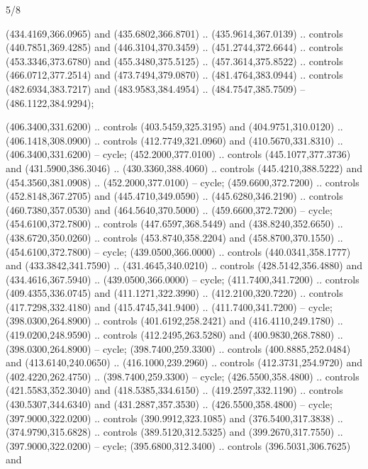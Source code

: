 \begin{flagdescription}{5/8}
\begin{scope}[shift={(0.5\flaglength,0.5\flagwidth)},scale=\flagwidth*\stretchfactor/820]
\begin{scope}[scale=1.84,xshift=-135mm,yshift=84mm]
\begin{scope}[y=0.80pt, x=0.80pt, yscale=-1, xscale=1]
\begin{scope}[cm={{1.01416,0.0,0.0,1.033,(-6.79641,-9.89449)}}]
\begin{scope}[draw=c24420e]
\begin{scope}[line width=0.131\lw]
  (434.4169,366.0965) and (435.6802,366.8701) .. (435.9614,367.0139) .. controls
  (440.7851,369.4285) and (446.3104,370.3459) .. (451.2744,372.6644) .. controls
  (453.3346,373.6780) and (455.3480,375.5125) .. (457.3614,375.8522) .. controls
  (466.0712,377.2514) and (473.7494,379.0870) .. (481.4764,383.0944) .. controls
  (482.6934,383.7217) and (483.9583,384.4954) .. (484.7547,385.7509) --
  (486.1122,384.9294);
\begin{scope}[fill=c67923d]
 (406.3400,331.6200) .. controls (403.5459,325.3195) and
  (404.9751,310.0120) .. (406.1418,308.0900) .. controls (412.7749,321.0960) and
  (410.5670,331.8310) .. (406.3400,331.6200) -- cycle;
 (452.2000,377.0100) .. controls (445.1077,377.3736) and
  (431.5900,386.3046) .. (430.3360,388.4060) .. controls (445.4210,388.5222) and
  (454.3560,381.0908) .. (452.2000,377.0100) -- cycle;
 (459.6600,372.7200) .. controls (452.8148,367.2705) and
  (445.4710,349.0590) .. (445.6280,346.2190) .. controls (460.7380,357.0530) and
  (464.5640,370.5000) .. (459.6600,372.7200) -- cycle;
 (454.6100,372.7800) .. controls (447.6597,368.5449) and
  (438.8240,352.6650) .. (438.6720,350.0260) .. controls (453.8740,358.2204) and
  (458.8700,370.1550) .. (454.6100,372.7800) -- cycle;
 (439.0500,366.0000) .. controls (440.0341,358.1777) and
  (433.3842,341.7590) .. (431.4645,340.0210) .. controls (428.5142,356.4880) and
  (434.4616,367.5940) .. (439.0500,366.0000) -- cycle;
 (411.7400,341.7200) .. controls (409.4355,336.0745) and
  (411.1271,322.3990) .. (412.2100,320.7220) .. controls (417.7298,332.4180) and
  (415.4745,341.9400) .. (411.7400,341.7200) -- cycle;
 (398.0300,264.8900) .. controls (401.6192,258.2421) and
  (416.4110,249.1780) .. (419.0200,248.9590) .. controls (412.2495,263.5280) and
  (400.9830,268.7880) .. (398.0300,264.8900) -- cycle;
 (398.7400,259.3300) .. controls (400.8885,252.0484) and
  (413.6140,240.0650) .. (416.1000,239.2960) .. controls (412.3731,254.9720) and
  (402.4220,262.4750) .. (398.7400,259.3300) -- cycle;
 (426.5500,358.4800) .. controls (421.5583,352.3040) and
  (418.5385,334.6150) .. (419.2597,332.1190) .. controls (430.5307,344.6340) and
  (431.2887,357.3530) .. (426.5500,358.4800) -- cycle;
 (397.9000,322.0200) .. controls (390.9912,323.1085) and
  (376.5400,317.3838) .. (374.9790,315.6828) .. controls (389.5120,312.5325) and
  (399.2670,317.7550) .. (397.9000,322.0200) -- cycle;
 (395.6800,312.3400) .. controls (396.5031,306.7625) and

\end{scope}
\end{scope}
\end{scope}
\end{scope}
\end{scope}
\end{scope}
\end{scope}
\end{flagdescription}

